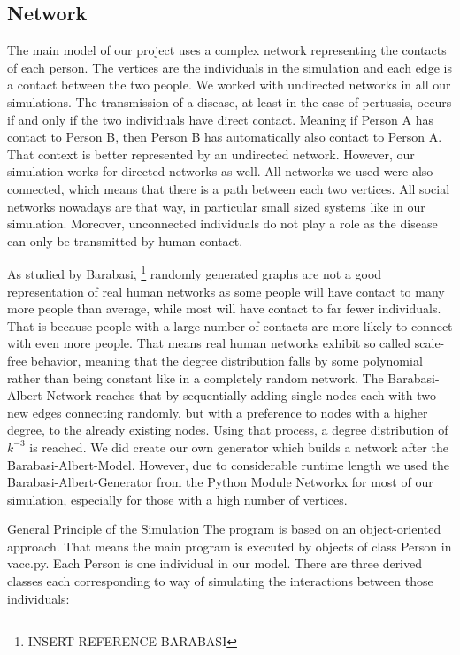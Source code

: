 \documentclass[11pt]{article}
\begin{document}
\subsection{Network}

The main model of our project uses a complex network representing the contacts of each person. The vertices are the individuals in the simulation and each edge is a contact between the two people. We worked with undirected networks in all our simulations. The transmission of a disease, at least in the case of pertussis, occurs if and only if the two individuals have direct contact. Meaning if Person A has contact to Person B, then Person B has automatically also contact to Person A. That context is better represented by an undirected network. However, our simulation works for directed networks as well.
All networks we used were also connected, which means that there is a path between each two vertices. All social networks nowadays are that way, in particular small sized systems like in our simulation. Moreover, unconnected individuals do not play a role as the disease can only be transmitted by human contact.

As studied by Barabasi, \footnote{INSERT REFERENCE BARABASI} randomly generated graphs are not a good representation of real human networks as some people will have contact to many more people than average, while most will have contact to far fewer individuals. That is because people with a large number of contacts are more likely to connect with even more people. That means real human networks exhibit so called scale-free behavior, meaning that the degree distribution falls by some polynomial rather than being constant like in a completely random network. The Barabasi-Albert-Network reaches that by sequentially adding single nodes each with two new edges connecting randomly, but with a preference to nodes with a higher degree, to the already existing nodes. Using that process, a degree distribution of $k^{-3}$ is reached. We did create our own generator which builds a network after the Barabasi-Albert-Model. However, due to considerable runtime length we used the Barabasi-Albert-Generator from the Python Module Networkx for most of our simulation, especially for those with a high number of vertices.

General Principle of the Simulation
The program is based on an object-oriented approach. That means the main program is executed by objects of class Person in vacc.py. Each Person is one individual in our model. There are three derived classes each corresponding to way of simulating the interactions between those individuals:
\end{document}

